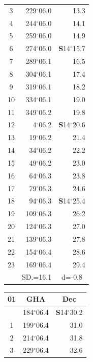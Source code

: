 \documentclass[10pt, a4paper]{report}
\begin{document}
\begin{scriptsize}
\begin{tabular*}{0.2\textwidth}[t]{@{\extracolsep{\fill}}|c|rr|}
3 & 229$^\circ$06.0 & \raisebox{0.24ex}{\boldmath$\cdot$~\boldmath$\cdot$~~}13.3\\
4 & 244$^\circ$06.0 & 14.1\\
5 & 259$^\circ$06.0 & 14.9\\[2Pt]
6 & 274$^\circ$06.0 & \textbf{S}14$^\circ$15.7\\
7 & 289$^\circ$06.1 & 16.5\\
8 & 304$^\circ$06.1 & 17.4\\
9 & 319$^\circ$06.1 & \raisebox{0.24ex}{\boldmath$\cdot$~\boldmath$\cdot$~~}18.2\\
10 & 334$^\circ$06.1 & 19.0\\
11 & 349$^\circ$06.2 & 19.8\\[2Pt]
12 & 4$^\circ$06.2 & \textbf{S}14$^\circ$20.6\\
13 & 19$^\circ$06.2 & 21.4\\
14 & 34$^\circ$06.2 & 22.2\\
15 & 49$^\circ$06.2 & \raisebox{0.24ex}{\boldmath$\cdot$~\boldmath$\cdot$~~}23.0\\
16 & 64$^\circ$06.3 & 23.8\\
17 & 79$^\circ$06.3 & 24.6\\[2Pt]
18 & 94$^\circ$06.3 & \textbf{S}14$^\circ$25.4\\
19 & 109$^\circ$06.3 & 26.2\\
20 & 124$^\circ$06.3 & 27.0\\
21 & 139$^\circ$06.3 & \raisebox{0.24ex}{\boldmath$\cdot$~\boldmath$\cdot$~~}27.8\\
22 & 154$^\circ$06.4 & 28.6\\
23 & 169$^\circ$06.4 & 29.4\\
\hline
\rule{0pt}{2.4ex} & \multicolumn{1}{c}{SD.=16.1} & \multicolumn{1}{c|}{d=-0.8}\\
\hline
\end{tabular*}\noindent
\begin{tabular*}{0.2\textwidth}[t]{@{\extracolsep{\fill}}|c|rr|}
\hline
\multicolumn{1}{|c|}{\rule{0pt}{2.6ex}\textbf{01}} & \multicolumn{1}{c}{\textbf{GHA}} & \multicolumn{1}{c|}{\textbf{Dec}}\\
\hline\rule{0pt}{2.6ex}\noindent
0 & 184$^\circ$06.4 & \textbf{S}14$^\circ$30.2\\
1 & 199$^\circ$06.4 & 31.0\\
2 & 214$^\circ$06.4 & 31.8\\
3 & 229$^\circ$06.4 & \raisebox{0.24ex}{\boldmath$\cdot$~\boldmath$\cdot$~~}32.6\\

\end{tabular*}
\end{scriptsize}
\end{document}
